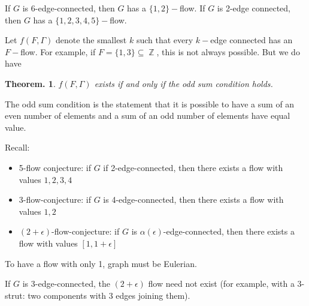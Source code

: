 \documentclass[11pt, a4paper]{memoir}
\DeclareMathOperator{\Z}{{\mathbb{Z}}}
\theoremstyle{change}
\newtheorem{theorem}{Theorem.}[section]
\theoremstyle{plain}
\theoremstyle{nonumberplain}
\numberwithin{equation}{section}
\begin{document}
If $G$ is 6-edge-connected, then $G$ has a $\{1,2\}-$flow.
If $G$ is 2-edge connected, then $G$ has a $\{1,2,3,4,5\}-$flow.

Let $f(F,\Gamma)$ denote the smallest $k$ such that every $k-$edge connected has an $F-$flow.
For example, if $F=\{1,3\}\subseteq\Z$, this is not always possible.
But we do have
\begin{theorem}
    $f(F,\Gamma)$ exists if and only if the odd sum condition holds.
\end{theorem}
The odd sum condition is the statement that it is possible to have a sum of an even number of elements and a sum of an odd number of elements have equal value.

Recall:
\begin{itemize}[nl]
    \item 5-flow conjecture: if $G$ if 2-edge-connected, then there exists a flow with values $1,2,3,4$
    \item 3-flow-conjecture: if $G$ is 4-edge-connected, then there exists a flow with values $1,2$
    \item $(2+\epsilon)$-flow-conjecture: if $G$ is $\alpha(\epsilon)$-edge-connected, then there exists a flow with values $[1,1+\epsilon]$
\end{itemize}
To have a flow with only 1, graph must be Eulerian.

If $G$ is 3-edge-connected, the $(2+\epsilon)$ flow need not exist (for example, with a 3-strut: two components with 3 edges joining them).
\end{document}
